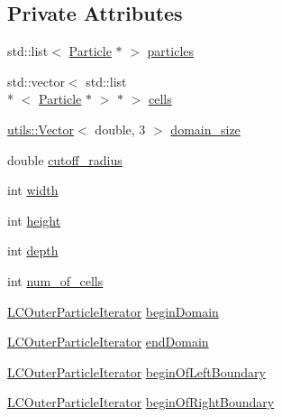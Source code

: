 \subsection*{Private Attributes}
\begin{DoxyCompactItemize}
\item 
std\-::list$<$ \hyperlink{classParticle}{Particle} $\ast$ $>$ \hyperlink{classutils_1_1LCParticleContainer_a4cf8fa8ce772044b98fadb8897cbc890}{particles}
\item 
std\-::vector$<$ std\-::list\\*
$<$ \hyperlink{classParticle}{Particle} $\ast$ $>$ $\ast$ $>$ \hyperlink{classutils_1_1LCParticleContainer_a58bb20ad90c455f1400c35379784a0ae}{cells}
\item 
\hyperlink{classutils_1_1Vector}{utils\-::\-Vector}$<$ double, 3 $>$ \hyperlink{classutils_1_1LCParticleContainer_a6d8c9f033d0045ba9cd4353f2c009486}{domain\-\_\-size}
\item 
double \hyperlink{classutils_1_1LCParticleContainer_a47cf29a8a8830ccce0f04f84f20ce740}{cutoff\-\_\-radius}
\item 
int \hyperlink{classutils_1_1LCParticleContainer_a8f0d10a0d6fb422670bc587238ef6662}{width}
\item 
int \hyperlink{classutils_1_1LCParticleContainer_a4f1ca4e9e040fc64a5e17a60673dd669}{height}
\item 
int \hyperlink{classutils_1_1LCParticleContainer_a486b4cb6c669b107a5cbc76a0a115aa8}{depth}
\item 
int \hyperlink{classutils_1_1LCParticleContainer_aaa76d8cdecdb35e4d115f483c328aa3c}{num\-\_\-of\-\_\-cells}
\item 
\hyperlink{classutils_1_1LCOuterParticleIterator}{L\-C\-Outer\-Particle\-Iterator} \hyperlink{classutils_1_1LCParticleContainer_a419381c67176cc0ad6618a0a882c414e}{begin\-Domain}
\item 
\hyperlink{classutils_1_1LCOuterParticleIterator}{L\-C\-Outer\-Particle\-Iterator} \hyperlink{classutils_1_1LCParticleContainer_ae5d7cfe4f3104c61a40f8c032e6f4ddc}{end\-Domain}
\item 
\hyperlink{classutils_1_1LCOuterParticleIterator}{L\-C\-Outer\-Particle\-Iterator} \hyperlink{classutils_1_1LCParticleContainer_ac6bc51afbdf2105ecf561d2bacf67e58}{begin\-Of\-Left\-Boundary}
\item 
\hyperlink{classutils_1_1LCOuterParticleIterator}{L\-C\-Outer\-Particle\-Iterator} \hyperlink{classutils_1_1LCParticleContainer_a2b0575ab2aa95d5a62327d1f64209cf8}{begin\-Of\-Right\-Boundary}
\item 

\end{DoxyCompactItemize}

